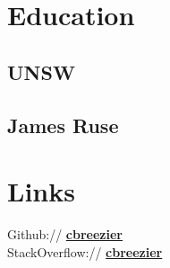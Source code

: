 \documentclass[letter]{deedy-resume} %
\begin{document}
\begin{minipage}[t]{0.33\textwidth} %


\section{Education} 

\subsection{UNSW}


\sectionspace %




\subsection{James Ruse}

\sectionspace %


\section{Links} 

Github:// \href{https://github.com/cbreezier}{\bf cbreezier} \\
StackOverflow:// \href{http://stackoverflow.com/users/3248882/cbreezier}{\bf cbreezier} \\


\end{minipage}
\end{document}
